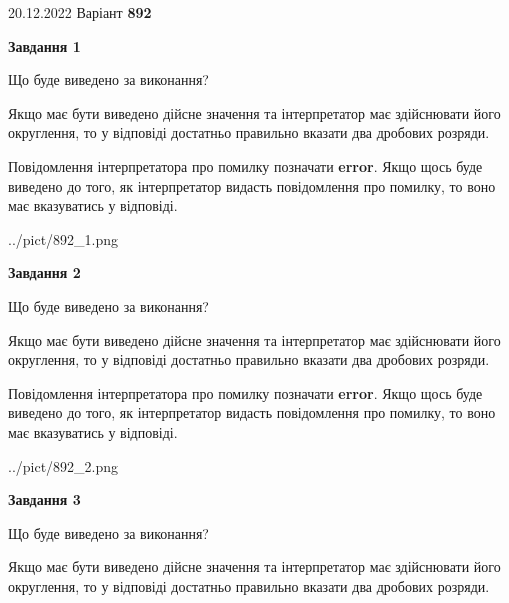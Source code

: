 \documentclass[12pt, ukrainian]{article}
\begin{document}
{20.12.2022 Варіант \No \textbf { 892 }\par}
{
\begin {Large}

{\begin {center}\textbf{Завдання 1}\end {center}}\par
Що буде виведено за виконання? \par

Якщо має бути виведено дійсне значення та інтерпретатор має здійснювати його округлення, 
то у відповіді достатньо правильно вказати два дробових розряди.

Повідомлення інтерпретатора про помилку позначати \textbf{error}.
Якщо щось буде виведено до того, як інтерпретатор видасть повідомлення про помилку, 
то воно має вказуватись у відповіді. \par

\begin{center}
	{../pict/892_1.png}
\end{center}
\newpage

{\begin {center}\textbf{Завдання 2}\end {center}}\par
Що буде виведено за виконання? \par

Якщо має бути виведено дійсне значення та інтерпретатор має здійснювати його округлення, 
то у відповіді достатньо правильно вказати два дробових розряди.

Повідомлення інтерпретатора про помилку позначати \textbf{error}.
Якщо щось буде виведено до того, як інтерпретатор видасть повідомлення про помилку, 
то воно має вказуватись у відповіді. \par

\begin{center}
	{../pict/892_2.png}
\end{center}
\newpage

{\begin {center}\textbf{Завдання 3}\end {center}}\par
Що буде виведено за виконання? \par

Якщо має бути виведено дійсне значення та інтерпретатор має здійснювати його округлення, 
то у відповіді достатньо правильно вказати два дробових розряди.


\end{Large}}
\end{document}
